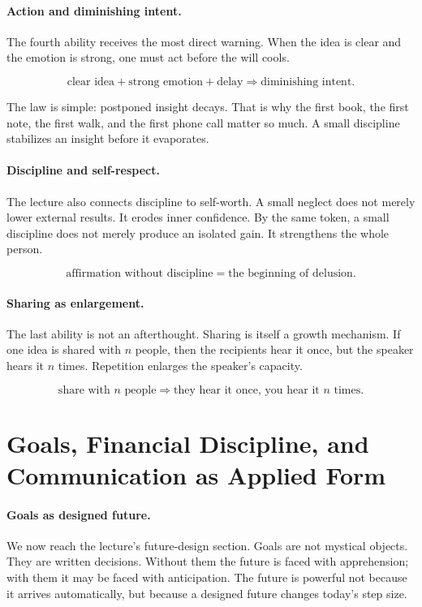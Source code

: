 \paragraph{Action and diminishing intent.}
The fourth ability receives the most direct warning. When the idea is clear and the emotion is strong, one must act before the will cools.

\begin{equation}
\text{clear idea}+\text{strong emotion}+\text{delay}\Rightarrow \text{diminishing intent}.
\end{equation}

The law is simple: postponed insight decays. That is why the first book, the first note, the first walk, and the first phone call matter so much. A small discipline stabilizes an insight before it evaporates.

\paragraph{Discipline and self-respect.}
The lecture also connects discipline to self-worth. A small neglect does not merely lower external results. It erodes inner confidence. By the same token, a small discipline does not merely produce an isolated gain. It strengthens the whole person.

\begin{equation}
\text{affirmation without discipline}=\text{the beginning of delusion}.
\end{equation}

\paragraph{Sharing as enlargement.}
The last ability is not an afterthought. Sharing is itself a growth mechanism. If one idea is shared with \(n\) people, then the recipients hear it once, but the speaker hears it \(n\) times. Repetition enlarges the speaker's capacity.

\begin{equation}
\text{share with } n \text{ people} \Rightarrow \text{they hear it once, you hear it } n \text{ times}.
\end{equation}

\section{Goals, Financial Discipline, and Communication as Applied Form}

\paragraph{Goals as designed future.}
We now reach the lecture's future-design section. Goals are not mystical objects. They are written decisions. Without them the future is faced with apprehension; with them it may be faced with anticipation. The future is powerful not because it arrives automatically, but because a designed future changes today's step size.

